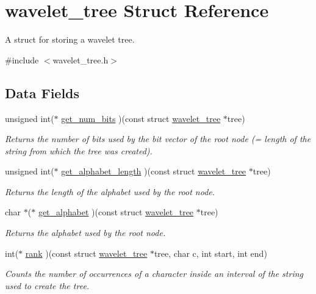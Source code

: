 \hypertarget{structwavelet__tree}{\section{wavelet\-\_\-tree \-Struct \-Reference}
\label{structwavelet__tree}
}


\-A struct for storing a wavelet tree.  




{\ttfamily \#include $<$wavelet\-\_\-tree.\-h$>$}

\subsection*{\-Data \-Fields}
\begin{DoxyCompactItemize}
\item 
unsigned int($\ast$ \hyperlink{structwavelet__tree_aa66e703dce8676f909c1a461c40b5abf}{get\-\_\-num\-\_\-bits} )(const struct \hyperlink{structwavelet__tree}{wavelet\-\_\-tree} $\ast$tree)
\begin{DoxyCompactList}\small\item\em \-Returns the number of bits used by the bit vector of the root node (= length of the string from which the tree was created). \end{DoxyCompactList}\item 
unsigned int($\ast$ \hyperlink{structwavelet__tree_a1905ffea2dc3815d49561237b4f8488a}{get\-\_\-alphabet\-\_\-length} )(const struct \hyperlink{structwavelet__tree}{wavelet\-\_\-tree} $\ast$tree)
\begin{DoxyCompactList}\small\item\em \-Returns the length of the alphabet used by the root node. \end{DoxyCompactList}\item 
char $\ast$($\ast$ \hyperlink{structwavelet__tree_a739eef1c9eb98267d0fdc75ba05d99b7}{get\-\_\-alphabet} )(const struct \hyperlink{structwavelet__tree}{wavelet\-\_\-tree} $\ast$tree)
\begin{DoxyCompactList}\small\item\em \-Returns the alphabet used by the root node. \end{DoxyCompactList}\item 
int($\ast$ \hyperlink{structwavelet__tree_ad578b3f750505527bcb0e9778cb26030}{rank} )(const struct \hyperlink{structwavelet__tree}{wavelet\-\_\-tree} $\ast$tree, char c, int start, int end)
\begin{DoxyCompactList}\small\item\em \-Counts the number of occurrences of a character inside an interval of the string used to create the tree. \end{DoxyCompactList}\item 

\end{DoxyCompactItemize}
